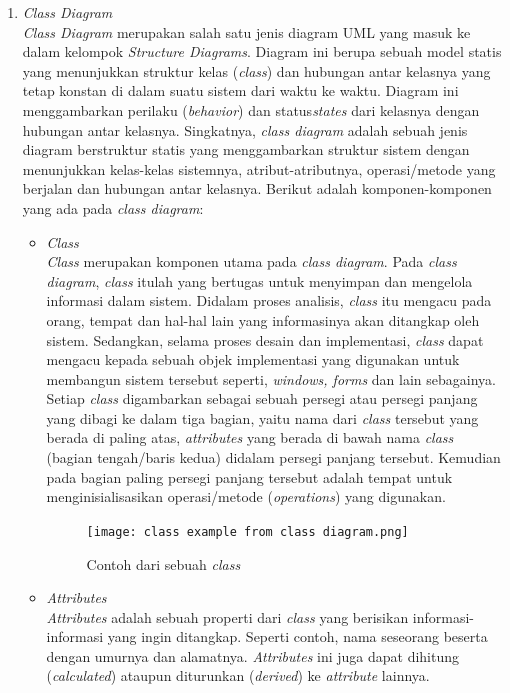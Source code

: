 \documentclass[a4paper]{article}
\begin{document}
\begin{enumerate}
    \item \textit{Class Diagram}\\
    \textit{Class Diagram} merupakan salah satu jenis diagram UML yang masuk ke dalam kelompok \textit{Structure Diagrams}. Diagram ini berupa sebuah model statis yang menunjukkan struktur kelas (\textit{class}) dan hubungan antar kelasnya yang tetap konstan di dalam suatu sistem dari waktu ke waktu. Diagram ini menggambarkan perilaku (\textit{behavior}) dan status\textit{states} dari kelasnya dengan hubungan antar kelasnya\autocite{systemanalysisdesign-class-diagram}. Singkatnya, \textit{class diagram} adalah sebuah jenis diagram berstruktur statis yang menggambarkan struktur sistem dengan menunjukkan kelas-kelas sistemnya, atribut-atributnya, operasi/metode yang berjalan dan hubungan antar kelasnya\autocite{what-is-class-diagram}. Berikut adalah komponen-komponen yang ada pada \textit{class diagram}:
    \begin{itemize}
        \item \textit{Class}\\
        \textit{Class} merupakan komponen utama pada \textit{class diagram}. Pada \textit{class diagram}, \textit{class} itulah yang bertugas untuk menyimpan dan mengelola informasi dalam sistem. Didalam proses analisis, \textit{class} itu mengacu pada orang, tempat dan hal-hal lain yang informasinya akan ditangkap oleh sistem. Sedangkan, selama proses desain dan implementasi, \textit{class} dapat mengacu kepada sebuah objek implementasi yang digunakan untuk membangun sistem tersebut seperti, \textit{windows, forms} dan lain sebagainya. Setiap \textit{class} digambarkan sebagai sebuah persegi atau persegi panjang yang dibagi ke dalam tiga bagian, yaitu nama dari \textit{class} tersebut yang berada di paling atas, \textit{attributes} yang berada di bawah nama \textit{class} (bagian tengah/baris kedua) didalam persegi panjang tersebut. Kemudian pada bagian paling persegi panjang tersebut adalah tempat untuk menginisialisasikan operasi/metode (\textit{operations}) yang digunakan\autocite{systemanalysisdesign-class-diagram}.
        \begin{figure}[h]
            \centering
            \texttt{[image: class example from class diagram.png]}
            \caption{Contoh dari sebuah \textit{class}}
        \end{figure}
        \item \textit{Attributes}\\
        \textit{Attributes} adalah sebuah properti dari \textit{class} yang berisikan informasi-informasi yang ingin ditangkap. Seperti contoh, nama seseorang beserta dengan umurnya dan alamatnya. \textit{Attributes} ini juga dapat dihitung (\textit{calculated}) ataupun diturunkan (\textit{derived}) ke \textit{attribute} lainnya\autocite{systemanalysisdesign-class-diagram}.

\end{itemize}
\end{enumerate}
\end{document}
